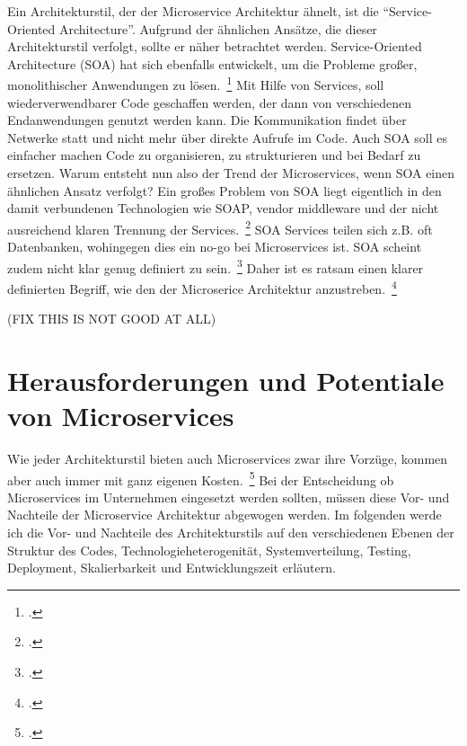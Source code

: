Ein Architekturstil, der der Microservice Architektur ähnelt, ist die ``Service-Oriented Architecture''. Aufgrund der ähnlichen Ansätze, die dieser Architekturstil verfolgt, sollte er näher betrachtet werden.
Service-Oriented Architecture (SOA) hat sich ebenfalls entwickelt, um die Probleme großer, monolithischer Anwendungen zu lösen.~\footcite[][Seite 8]{newman2015building} Mit Hilfe von Services, soll wiederverwendbarer Code geschaffen werden, der dann von verschiedenen Endanwendungen genutzt werden kann. Die Kommunikation findet über Netwerke statt und nicht mehr über direkte Aufrufe im Code. Auch SOA soll es einfacher machen Code zu organisieren, zu strukturieren und bei Bedarf zu ersetzen. Warum entsteht nun also der Trend der Microservices, wenn SOA einen ähnlichen Ansatz verfolgt? Ein großes Problem von SOA liegt eigentlich in den damit verbundenen Technologien wie SOAP, vendor middleware und der nicht ausreichend klaren Trennung der Services.~\footcite[][Seite 8]{newman2015building} SOA Services teilen sich z.B. oft Datenbanken, wohingegen dies ein no-go bei Microservices ist. SOA scheint zudem nicht klar genug definiert zu sein.~\footcite[vgl.][]{Fowler:Intro} Daher ist es ratsam einen klarer definierten Begriff, wie den der Microserice Architektur anzustreben.~\footcite[][]{Fowler:Intro}


(FIX THIS IS NOT GOOD AT ALL)

\section{Herausforderungen und Potentiale von Microservices}
Wie jeder Architekturstil bieten auch Microservices zwar ihre Vorzüge, kommen aber auch immer mit ganz eigenen Kosten.~\footcite[vgl.][]{Fowler:Guide}
Bei der Entscheidung ob Microservices im Unternehmen eingesetzt werden sollten, müssen diese Vor- und Nachteile der Microservice Architektur abgewogen werden.
Im folgenden werde ich die Vor- und Nachteile des Architekturstils auf den verschiedenen Ebenen der Struktur des Codes, Technologieheterogenität, Systemverteilung, Testing, Deployment, Skalierbarkeit und Entwicklungszeit erläutern.

